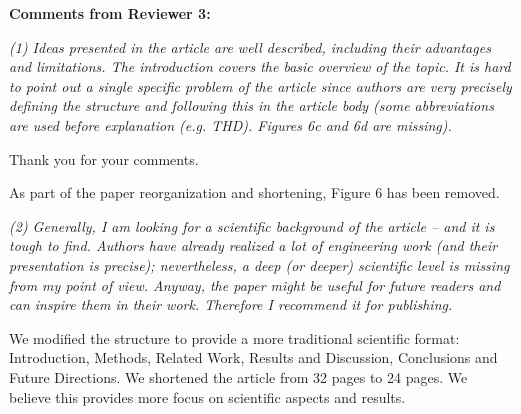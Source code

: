 \documentclass[12pt]{letter}
\begin{document}
\begin{letter}{}

{\bf Comments from Reviewer 3:}

{\em (1) Ideas presented in the article are well described, including their advantages and limitations. The introduction covers the basic overview of the topic. It is hard to point out a single specific problem of the article since authors are very precisely defining the structure and following this in the article body (some abbreviations are used before explanation (e.g. THD). Figures 6c and 6d are missing).}

Thank you for your comments.

As part of the paper reorganization and shortening, Figure 6 has been removed.


{\em (2) Generally, I am looking for a scientific background of the article – and it is tough to find. Authors have already realized a lot of engineering work (and their presentation is precise); nevertheless, a deep (or deeper) scientific level is missing from my point of view. Anyway, the paper might be useful for future readers and can inspire them in their work. Therefore I recommend it for publishing.}

We modified the structure to provide a more traditional scientific format: Introduction, Methods, Related Work, Results and Discussion, Conclusions and Future Directions. We shortened the article from 32 pages to 24 pages. We believe this provides more focus on scientific aspects and results.

\end{letter}
\end{document}

